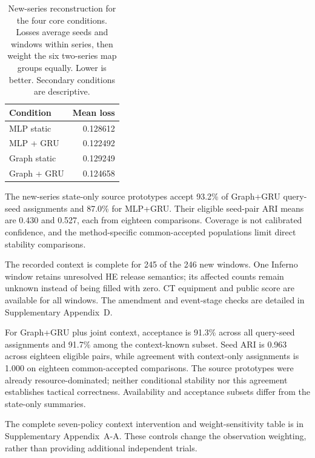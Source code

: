 \begin{table}[t]
\caption{New-series reconstruction for the four core conditions. Losses average seeds and windows within series, then weight the six two-series map groups equally. Lower is better. Secondary conditions are descriptive.}
\label{tab:external}
\centering
\begin{tabular}{lr}
\toprule
Condition & Mean loss\\
\midrule
MLP static & 0.128612 \\ %
MLP + GRU & 0.122492 \\ %
Graph static & 0.129249 \\ %
Graph + GRU & 0.124658 \\ %
\bottomrule
\end{tabular}
\end{table}

The new-series state-only source prototypes accept 93.2\% of Graph+GRU query-seed assignments and 87.0\% for MLP+GRU. Their eligible seed-pair ARI means are 0.430 and 0.527, each from eighteen comparisons. Coverage is not calibrated confidence, and the method-specific common-accepted populations limit direct stability comparisons. %

The recorded context is complete for 245 of the 246 new windows. One Inferno window retains unresolved HE release semantics; its affected counts remain unknown instead of being filled with zero. CT equipment and public score are available for all windows. The amendment and event-stage checks are detailed in Supplementary Appendix~D. %

For Graph+GRU plus joint context, acceptance is 91.3\% across all query-seed assignments and 91.7\% among the context-known subset. Seed ARI is 0.963 across eighteen eligible pairs, while agreement with context-only assignments is 1.000 on eighteen common-accepted comparisons. The source prototypes were already resource-dominated; neither conditional stability nor this agreement establishes tactical correctness. Availability and acceptance subsets differ from the state-only summaries. %

The complete seven-policy context intervention and weight-sensitivity table is in Supplementary Appendix~A-A. These controls change the observation weighting, rather than providing additional independent trials.

